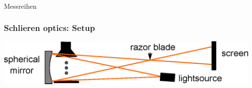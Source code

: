 \documentclass{beamer}
\begin{document}
\begin{frame}{Messreihen}

\end{frame}



\begin{frame}
\frametitle{Schlieren optics: Setup}
\begin{center}
\includegraphics[scale=0.6]{schlieren_setup_beschriftet}
\end{center}
\end{frame}
\end{document}
